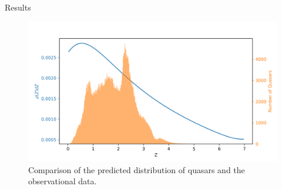 \documentclass{beamer}
\begin{document}
\begin{frame}{Results}
	\begin{figure}[h]
		\centering
		\includegraphics[width = 0.8\linewidth]{"../Files/Week 14/redshift_dist"}
		\caption{Comparison of the predicted distribution of quasars and the observational data.}
		\label{fig: universeDist}
	\end{figure}
\end{frame}
\end{document}
